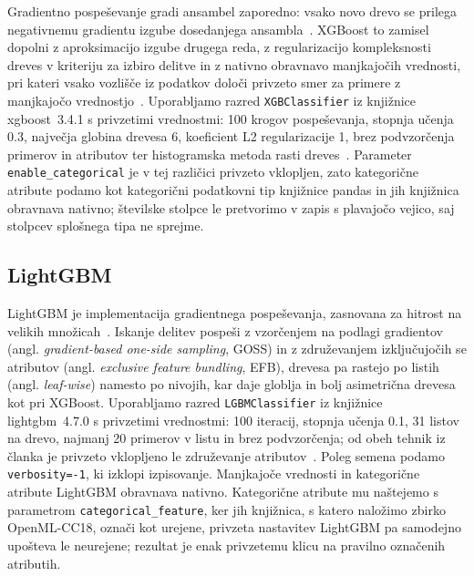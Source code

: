 \documentclass[a4paper,12pt,openright]{book}
\begin{document}
Gradientno pospeševanje gradi ansambel zaporedno: vsako novo drevo se prilega
negativnemu gradientu izgube dosedanjega ansambla~\cite{friedman2001greedy}.
XGBoost to zamisel dopolni z aproksimacijo izgube drugega reda, z regularizacijo
kompleksnosti dreves v kriteriju za izbiro delitve in z nativno obravnavo
manjkajočih vrednosti, pri kateri vsako vozlišče iz podatkov določi privzeto
smer za primere z manjkajočo vrednostjo~\cite{chen2016xgboost}. Uporabljamo
razred \texttt{XGBClassifier} iz knjižnice xgboost~3.4.1 s privzetimi
vrednostmi: 100 krogov pospeševanja, stopnja učenja \num{0.3}, največja globina
drevesa 6, koeficient L2 regularizacije 1, brez podvzorčenja primerov in
atributov ter histogramska metoda rasti dreves~\cite{xgboostdocs}. Parameter
\texttt{enable\_categorical} je v tej različici privzeto vklopljen, zato
kategorične atribute podamo kot kategorični podatkovni tip knjižnice pandas in
jih knjižnica obravnava nativno; številske stolpce le pretvorimo v zapis s
plavajočo vejico, saj stolpcev splošnega tipa ne sprejme.

\subsection{LightGBM}
\label{sec:lightgbm}

LightGBM je implementacija gradientnega pospeševanja, zasnovana za hitrost na
velikih množicah~\cite{ke2017lightgbm}. Iskanje delitev pospeši z vzorčenjem na
podlagi gradientov (angl. \emph{gradient-based one-side sampling}, GOSS) in z
združevanjem izključujočih se atributov (angl. \emph{exclusive feature
bundling}, EFB), drevesa pa rastejo po listih (angl. \emph{leaf-wise}) namesto
po nivojih, kar daje globlja in bolj asimetrična drevesa kot pri XGBoost.
Uporabljamo razred \texttt{LGBMClassifier} iz knjižnice lightgbm~4.7.0 s
privzetimi vrednostmi: 100 iteracij, stopnja učenja \num{0.1}, 31 listov na
drevo, najmanj 20 primerov v listu in brez podvzorčenja; od obeh tehnik iz
članka je privzeto vklopljeno le združevanje atributov~\cite{lightgbmdocs}.
Poleg semena podamo \texttt{verbosity=-1}, ki izklopi izpisovanje. Manjkajoče
vrednosti in kategorične atribute LightGBM obravnava nativno. Kategorične
atribute mu naštejemo s parametrom \texttt{categorical\_feature}, ker jih
knjižnica, s katero naložimo zbirko OpenML-CC18, označi kot urejene, privzeta
nastavitev LightGBM pa samodejno upošteva le neurejene; rezultat je enak
privzetemu klicu na pravilno označenih atributih.
\end{document}
